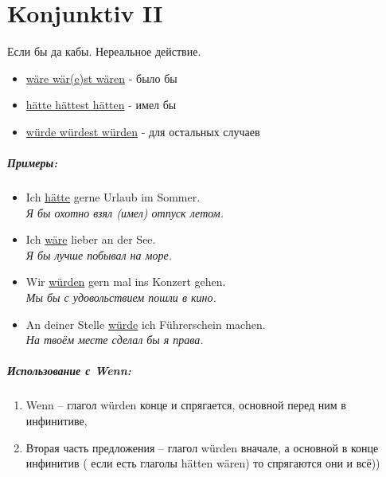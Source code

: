 \documentclass[12pt,a4paper]{report}
\newcommand{\satzew}[1]{\underline{#1}}
\newcommand{\ubersatze}[1]{\textit{#1}}
\begin{document}
\chapter{Konjunktiv II}
Если бы да кабы. Нереальное действие.

\begin{itemize}
    \item \satzew{wäre wär(e)st wären} - было бы
    \item \satzew{hätte hättest hätten} - имел бы
    \item \satzew{würde würdest würden} - для остальных случаев
\end{itemize}

\paragraph{Примеры:}
\begin{itemize}
    \item Ich \satzew{hätte} gerne Urlaub im Sommer.
          ~\\ \ubersatze{Я бы охотно взял (имел) отпуск летом.}
    \item Ich \satzew{wäre} lieber an der See.
          ~\\ \ubersatze{Я бы лучше побывал на море.}
    \item Wir \satzew{würden} gern mal ins Konzert gehen.
          ~\\ \ubersatze{Мы бы с удовольствием пошли в кино.}
    \item An deiner Stelle \satzew{würde} ich Führerschein machen.
          ~\\ \ubersatze{На твоём месте сделал бы я права.}
\end{itemize}

\paragraph{Использование с Wenn:}

\begin{enumerate}
    \item Wenn – глагол würden  конце и спрягается, основной перед ним в инфинитиве,
    \item Вторая часть предложения – глагол würden вначале, а основной в конце инфинитив ( если есть глаголы hätten wären) то спрягаются они и всё))
\end{enumerate}
\end{document}
